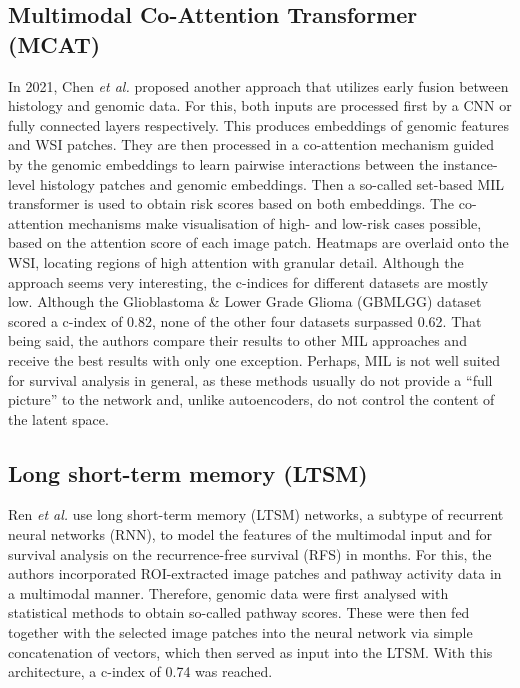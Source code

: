 \subsection{Multimodal Co-Attention Transformer (MCAT)} 
In 2021, Chen \textit{et al.} proposed another approach that utilizes early fusion between histology and genomic data. For this, both inputs are processed first by a CNN or fully connected layers respectively. This produces embeddings of genomic features and WSI patches. They are then processed in a co-attention mechanism guided by the genomic embeddings to learn pairwise interactions between the instance-level histology patches and genomic embeddings. Then a so-called set-based MIL transformer is used to obtain risk scores based on both embeddings. The co-attention mechanisms make visualisation of high- and low-risk cases possible, based on the attention score of each image patch. Heatmaps are overlaid onto the WSI, locating regions of high attention with granular detail. Although the approach seems very interesting, the c-indices for different datasets are mostly low. Although the Glioblastoma \& Lower Grade Glioma (GBMLGG) dataset scored a c-index of 0.82, none of the other four datasets surpassed 0.62. That being said, the authors compare their results to other MIL approaches and receive the best results with only one exception. \cite{Chen2021Multimodal}
Perhaps, MIL is not well suited for survival analysis in general, as these methods usually do not provide a “full picture” to the network and, unlike autoencoders, do not control the content of the latent space. 
\subsection{Long short-term memory (LTSM)} 
Ren \textit{et al.} use long short-term memory (LTSM) networks, a subtype of recurrent neural networks (RNN), to model the features of the multimodal input and for survival analysis on the recurrence-free survival (RFS) in months. For this, the authors incorporated ROI-extracted image patches and pathway activity data in a multimodal manner. Therefore, genomic data were first analysed with statistical methods to obtain so-called pathway scores. These were then fed together with the selected image patches into the neural network via simple concatenation of vectors, which then served as input into the LTSM. With this architecture, a c-index of 0.74 was reached. \cite{Ren2018Recurrence}

